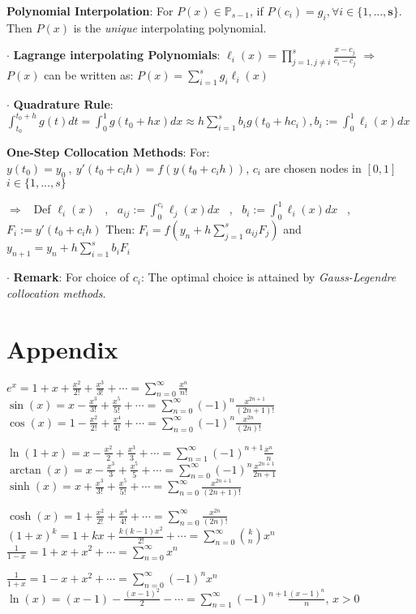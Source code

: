 \documentclass[9pt]{article}
\begin{document}
\textbf{Polynomial Interpolation}: For $P(x)\in\mathbb{P}_{s-1}$, if $P(c_i)=g_i,\forall i\in\{1,...,\mathbf{s}\}$. Then $P(x)$ is the \textit{unique} interpolating polynomial.

$\cdot$ \textbf{Lagrange interpolating Polynomials}: $\ell_{i}(x)=\prod\limits_{j=1,j\ne i}^{s}\frac{x-c_j}{c_i-c_j}$ \quad \quad $\Rightarrow$ $P(x)$ can be written as: $P(x)=\sum\limits_{i=1}^{s}g_i\ell_i(x)$

\vspace{-2pt}
$\cdot$ \textbf{Quadrature Rule}: {\small $\int^{t_0+h}_{t_0}g(t)dt=\int^1_0g(t_0+hx)dx\approx h\sum_{i=1}^{s}b_ig(t_0+hc_i),b_i:=\int^1_0\ell_i(x)dx$}  

\textbf{One-Step Collocation Methods}: For: $y(t_0)=y_0 \ , \ y'(t_0+c_ih)=f(y(t_0+c_ih))$, $c_i$ are chosen nodes in $[0,1]$ \ $i\in\{1,...,s\}$

{\small $\Rightarrow$ \ Def $\ell_i(x)$ \ , \ $a_{ij}:=\int_0^{c_i}\ell_j(x)dx$ \ , \ $b_i:=\int_0^1\ell_i(x)dx$ \ , \ $F_i:=y'(t_0+c_ih)$} \quad Then: $F_i=f(y_n+h\sum_{j=1}^{s}a_{ij}F_j)$ and $y_{n+1}=y_n+h\sum_{i=1}^{s}b_iF_i$

$\cdot$ \textbf{Remark}: {\footnotesize For choice of $c_i$: The optimal choice is attained by \textit{Gauss-Legendre collocation methods}}.


\section{Appendix} 

\small
$e^x = 1 + x + \frac{x^2}{2!} + \frac{x^3}{3!} + \cdots  = \sum_{n=0}^\infty \frac{x^n}{n!}$ \quad $ \sin(x) = x - \frac{x^3}{3!} + \frac{x^5}{5!} + \cdots = \sum_{n=0}^\infty (-1)^n \frac{x^{2n+1}}{(2n+1)!} $ \quad $\cos(x) = 1 - \frac{x^2}{2!} + \frac{x^4}{4!} + \cdots = \sum_{n=0}^\infty (-1)^n \frac{x^{2n}}{(2n)!}$

$\ln(1+x) = x - \frac{x^2}{2} + \frac{x^3}{3}  + \cdots = \sum_{n=1}^\infty (-1)^{n+1} \frac{x^n}{n}$ \quad $\arctan(x) = x - \frac{x^3}{3} + \frac{x^5}{5} + \cdots = \sum_{n=0}^\infty (-1)^n \frac{x^{2n+1}}{2n+1}$ \quad $\sinh(x) = x + \frac{x^3}{3!} + \frac{x^5}{5!} + \cdots = \sum_{n=0}^\infty \frac{x^{2n+1}}{(2n+1)!}$

$\cosh(x) = 1 + \frac{x^2}{2!} + \frac{x^4}{4!} + \cdots = \sum_{n=0}^\infty \frac{x^{2n}}{(2n)!}$  \quad $(1+x)^k = 1 + kx + \frac{k(k-1)x^2}{2!} + \cdots = \sum_{n=0}^\infty \binom{k}{n} x^n$ $\frac{1}{1-x} = 1 + x + x^2  + \cdots = \sum_{n=0}^\infty x^n $ 

$\frac{1}{1+x} = 1 - x + x^2  + \cdots = \sum_{n=0}^\infty (-1)^n x^n$ \quad $\ln(x) = (x-1) - \frac{(x-1)^2}{2} - \cdots = \sum_{n=1}^\infty (-1)^{n+1} \frac{(x-1)^n}{n}, \, x > 0$
\end{document}
